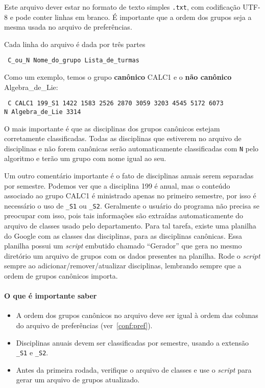 \documentclass[a4paper, 12pt]{report}
\begin{document}
Este arquivo dever estar no formato de texto simples \texttt{.txt},
com codificação UTF-8 e pode conter linhas em branco. É importante que
a ordem dos grupos seja a mesma usada no arquivo de preferências.

Cada linha do arquivo é dada por três partes
\begin{center} \tt
  C\_ou\_N Nome\_do\_grupo Lista\_de\_turmas
\end{center}

Como um exemplo, temos o grupo \textbf{canônico} CALC1 e o \textbf{não
  canônico} Algebra\_de\_Lie:
\begin{flushleft} \tt
C CALC1 199\_S1 1422 1583 2526 2870 3059 3203 4545 5172 6073\\
N Algebra\_de\_Lie	3314
\end{flushleft}
O mais importante é que as disciplinas dos grupos canônicos estejam
corretamente classificadas. Todas as disciplinas que estiverem no
arquivo de disciplinas e não forem canônicas serão automaticamente
classificadas com \texttt{N} pelo algoritmo e terão um grupo com nome
igual ao seu.

Um outro comentário importante é o fato de disciplinas anuais serem
separadas por semestre. Podemos ver que a disciplina 199 é anual, mas
o conteúdo associado ao grupo CALC1 é ministrado apenas no primeiro
semestre, por isso é necessário o uso de \texttt{\_S1} ou
\texttt{\_S2}. Geralmente o usuário do programa não precisa se
preocupar com isso, pois tais informações são extraídas
automaticamente do arquivo de classes usado pelo departamento. Para
tal tarefa, existe uma planilha do Google com as classes das
disciplinas, para as disciplinas canônicas. Essa planilha possui um
\textit{script} embutido chamado ``Gerador'' que gera no mesmo
diretório um arquivo de grupos com os dados presentes na
planilha. Rode o \textit{script} sempre ao adicionar/remover/atualizar
disciplinas, lembrando sempre que a ordem de grupos canônicos importa.

\paragraph{O que é importante saber}

\begin{itemize}
\item A ordem dos grupos canônicos no arquivo deve ser igual à ordem
  das colunas do arquivo de preferências (ver~\ref{conf:pref}).

\item Disciplinas anuais devem ser classificadas por semestre, usando
  a extensão \texttt{\_S1} e \texttt{\_S2}.

\item Antes da primeira rodada, verifique o arquivo de classes e use o
  \textit{script} para gerar um arquivo de grupos atualizado.
\end{itemize}
\end{document}
